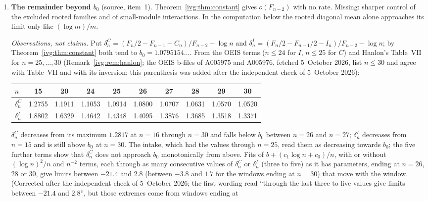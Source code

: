 \documentclass[11pt,letterpaper]{article}
\theoremstyle{definition}\newtheorem{definition}[theorem]{Definition}
\theoremstyle{remark}\newtheorem{remark}[theorem]{Remark}
\begin{document}
\begin{enumerate}
\item\label{ivg:q:remainder} \textbf{The remainder beyond $b_0$} (source,
 item~1). Theorem~\ref{ivg:thm:constant} gives $o(F_{n-2})$ with no rate.
 Missing: sharper control of the excluded rooted families and of
 small-module interactions. In the computation below the rooted diagonal
 mean alone approaches its limit only like $(\log m)/m$.

 \emph{Observations, not claims.} Put
 $\delta^C_n=(F_n/2-F_{n-1}-C_n)/F_{n-2}-\log n$ and
 $\delta^I_n=(F_n/2-F_{n-1}/2-I_n)/F_{n-2}-\log n$; by
 Theorem~\ref{ivg:thm:constant} both tend to $b_0=1.0795154\ldots$. From the
 OEIS terms ($n\le24$ for $I$, $n\le25$ for $C$) and Hanlon's Table~VII for
 $n=25,\dots,30$ (Remark~\ref{ivg:rem:hanlon}; the OEIS b-files of A005975
 and A005976, fetched 5~October 2026, list $n\le30$ and agree with Table~VII
 and with its inversion; this parenthesis was added after the independent
 check of 5~October 2026):
 \begin{center}\small\setlength{\tabcolsep}{4pt}
 \begin{tabular}{@{}lccccccccc@{}}\toprule
 $n$ & 15 & 20 & 24 & 25 & 26 & 27 & 28 & 29 & 30\\\midrule
 $\delta^C_n$ & 1.2755 & 1.1911 & 1.1053 & 1.0914 & 1.0800 & 1.0707 & 1.0631 & 1.0570 & 1.0520\\
 $\delta^I_n$ & 1.8802 & 1.6329 & 1.4642 & 1.4348 & 1.4095 & 1.3876 & 1.3685 & 1.3518 & 1.3371\\
 \bottomrule\end{tabular}
 \end{center}
 $\delta^C_n$ decreases from its maximum $1.2817$ at $n=16$ through $n=30$
 and falls below $b_0$ between $n=26$ and $n=27$; $\delta^I_n$ decreases
 from $n=15$ and is still above $b_0$ at $n=30$. The intake, which had the
 values through $n=25$, read them as decreasing towards $b_0$; the five
 further terms show that $\delta^C_n$ does not approach $b_0$ monotonically
 from above. Fits of $b+(c_1\log n+c_0)/n$, with or without
 $(\log n)^2/n$ and $n^{-2}$ terms, each through as many consecutive values of
 $\delta^C_n$ or $\delta^I_n$ (three to five) as it has parameters, ending at
 $n=26$, $28$ or $30$, give limits between $-21.4$ and $2.8$ (between $-3.8$
 and $1.7$ for the windows ending at $n=30$) that move with the window.
 \textup{(Corrected after the independent check of 5~October 2026; the first
 wording read ``through the last three to five values give limits between
 $-21.4$ and $2.8$'', but those extremes come from windows ending at
}
\end{enumerate}
\end{document}
